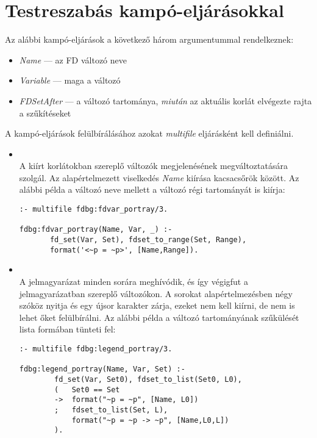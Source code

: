 \section{Testreszabás kampó-eljárásokkal}

Az alábbi kampó-eljárások a következő három argumentummal rendelkeznek:

\begin{itemize}
\item \emph{Name} --- az FD változó neve
\item \emph{Variable} --- maga a változó
\item \emph{FDSetAfter} --- a változó tartománya, \emph{miután} az aktuális
  korlát elvégezte rajta a szűkítéseket
\end{itemize}

A kampó-eljárások felülbírálásához azokat \emph{multifile} eljárásként kell definiálni.

\begin{itemize}
\item {}\\
  A kiírt korlátokban szereplő változók megjelenésének megváltoztatására
  szolgál. Az alapértelmezett viselkedés \textsl{Name} kiírása kacsacsőrök
  között. Az alábbi példa a változó neve mellett a változó régi tartományát is
  kiírja:

\begin{verbatim}
:- multifile fdbg:fdvar_portray/3.

fdbg:fdvar_portray(Name, Var, _) :-
       fd_set(Var, Set), fdset_to_range(Set, Range),
       format('<~p = ~p>', [Name,Range]).
\end{verbatim}

\item {}\\
  A jelmagyarázat minden sorára meghívódik, és így végigfut a jelmagyarázatban
  szereplő változókon. A sorokat alapértelmezésben négy szóköz nyitja és egy
  újsor karakter zárja, ezeket nem kell kiírni, de nem is lehet őket felülbírálni.
  Az alábbi példa a változó tartományának szűkülését lista formában tünteti fel:

\begin{verbatim}
:- multifile fdbg:legend_portray/3.

fdbg:legend_portray(Name, Var, Set) :-
        fd_set(Var, Set0), fdset_to_list(Set0, L0),
        (   Set0 == Set
        ->  format("~p = ~p", [Name, L0])
        ;   fdset_to_list(Set, L),
            format("~p = ~p -> ~p", [Name,L0,L])
        ).
\end{verbatim}
\end{itemize}

